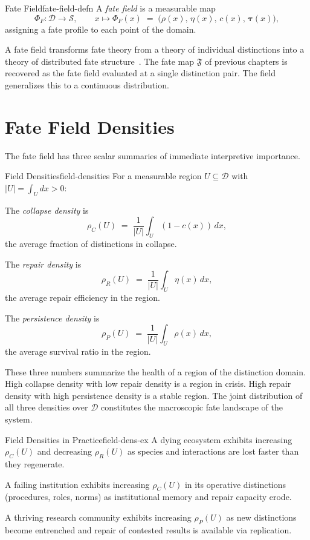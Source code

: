 \documentclass[12pt,twoside,openright]{book}
\newcommand{\fateMap}{\mathfrak{F}}
\newcommand{\fateSpace}{\mathcal{S}}
\newcommand{\survRatio}{\rho}             %
\newcommand{\repEff}{\eta}               %
\newcommand{\collapseInd}{c}             %
\providecommand{\fateField}{\Phi_{F}}
\providecommand{\collapDens}[1]{\rho_{C}(#1)}
\providecommand{\repairDens}[1]{\rho_{R}(#1)}
\providecommand{\persistDens}[1]{\rho_{P}(#1)}
\begin{document}
\begin{definition}{Fate Field}{fate-field-defn}
A \emph{fate field} is a measurable map
\[
  \fateField:\mathcal{D}\longrightarrow\fateSpace,
  \qquad
  x\longmapsto\fateField(x)
  \;=\;
  \bigl(
    \survRatio(x),\,\repEff(x),\,\collapseInd(x),\,
    \boldsymbol{\tau}(x)
  \bigr),
\]
assigning a fate profile to each point of the domain.
\end{definition}

A fate field transforms fate theory from a theory of individual
distinctions into a theory of distributed fate structure~\cite{ashby1956}. The
fate map $\fateMap$ of previous chapters is recovered as the
fate field evaluated at a single distinction pair. The field
generalizes this to a continuous distribution.

\section{Fate Field Densities}

The fate field has three scalar summaries of immediate
interpretive importance.

\begin{definition}{Field Densities}{field-densities}
For a measurable region $U\subseteq\mathcal{D}$ with
$|U|=\int_U dx>0$:

The \emph{collapse density} is
\[
  \collapDens{U}
  \;=\;
  \frac{1}{|U|}\int_U (1-\collapseInd(x))\,dx,
\]
the average fraction of distinctions in collapse.

The \emph{repair density} is
\[
  \repairDens{U}
  \;=\;
  \frac{1}{|U|}\int_U \repEff(x)\,dx,
\]
the average repair efficiency in the region.

The \emph{persistence density} is
\[
  \persistDens{U}
  \;=\;
  \frac{1}{|U|}\int_U \survRatio(x)\,dx,
\]
the average survival ratio in the region.
\end{definition}

These three numbers summarize the health of a region of the
distinction domain. High collapse density with low repair
density is a region in crisis. High repair density with high
persistence density is a stable region. The joint distribution
of all three densities over $\mathcal{D}$ constitutes the
macroscopic fate landscape of the system.

\begin{example}{Field Densities in Practice}{field-dens-ex}
A dying ecosystem exhibits increasing $\collapDens{U}$ and
decreasing $\repairDens{U}$ as species and interactions are
lost faster than they regenerate.

A failing institution exhibits increasing $\collapDens{U}$ in
its operative distinctions (procedures, roles, norms) as
institutional memory and repair capacity erode.

A thriving research community exhibits increasing
$\persistDens{U}$ as new distinctions become entrenched and
repair of contested results is available via replication.
\end{example}
\end{document}
